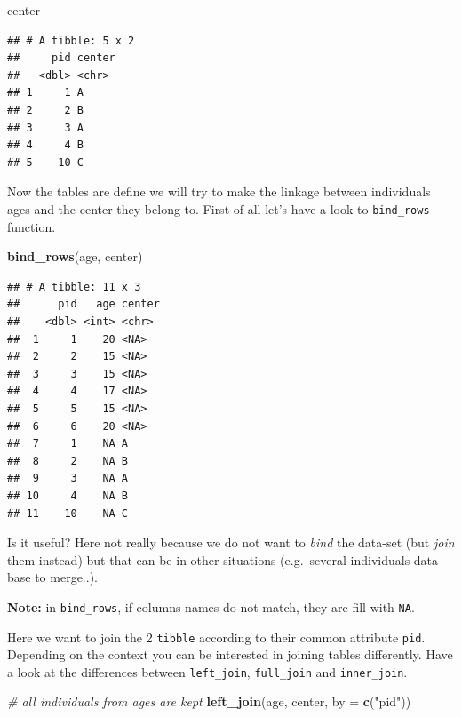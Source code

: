 \documentclass[
]{book}
\newenvironment{Shaded}{\begin{snugshade}}{\end{snugshade}}
\newcommand{\AttributeTok}[1]{\textcolor[rgb]{0.13,0.29,0.53}{#1}}
\newcommand{\CommentTok}[1]{\textcolor[rgb]{0.56,0.35,0.01}{\textit{#1}}}
\newcommand{\FunctionTok}[1]{\textcolor[rgb]{0.13,0.29,0.53}{\textbf{#1}}}
\newcommand{\NormalTok}[1]{#1}
\newcommand{\StringTok}[1]{\textcolor[rgb]{0.31,0.60,0.02}{#1}}
\begin{document}
\begin{Shaded}
\begin{Highlighting}[]
\NormalTok{center}
\end{Highlighting}
\end{Shaded}

\begin{verbatim}
## # A tibble: 5 x 2
##     pid center
##   <dbl> <chr> 
## 1     1 A     
## 2     2 B     
## 3     3 A     
## 4     4 B     
## 5    10 C
\end{verbatim}

Now the tables are define we will try to make the linkage between individuals ages and the center
they belong to.
First of all let's have a look to \texttt{bind\_rows} function.

\begin{Shaded}
\begin{Highlighting}[]
\FunctionTok{bind\_rows}\NormalTok{(age, center)}
\end{Highlighting}
\end{Shaded}

\begin{verbatim}
## # A tibble: 11 x 3
##      pid   age center
##    <dbl> <int> <chr> 
##  1     1    20 <NA>  
##  2     2    15 <NA>  
##  3     3    15 <NA>  
##  4     4    17 <NA>  
##  5     5    15 <NA>  
##  6     6    20 <NA>  
##  7     1    NA A     
##  8     2    NA B     
##  9     3    NA A     
## 10     4    NA B     
## 11    10    NA C
\end{verbatim}

Is it useful?
Here not really because we do not want to \emph{bind} the data-set (but \emph{join} them instead) but that can be in other situations (e.g.~several individuals data base to merge..).

\textbf{Note:} in \texttt{bind\_rows}, if columns names do not match, they are fill with \texttt{NA}.

Here we want to join the 2 \texttt{tibble} according to their common attribute \texttt{pid}. Depending
on the context you can be interested in joining tables differently. Have a look at the differences
between \texttt{left\_join}, \texttt{full\_join} and \texttt{inner\_join}.

\begin{Shaded}
\begin{Highlighting}[]
\CommentTok{\# all individuals from ages are kept}
\FunctionTok{left\_join}\NormalTok{(age, center, }\AttributeTok{by =} \FunctionTok{c}\NormalTok{(}\StringTok{"pid"}\NormalTok{))}
\end{Highlighting}
\end{Shaded}
\end{document}
